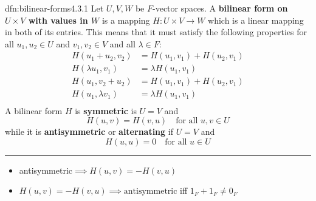 \documentclass[landscape, 8pt]{extarticle}
\DeclareMathOperator{\sgn}{sgn}
\DeclareMathOperator{\Mat}{Mat}
\begin{document}
\begin{multicols}{3}
%
%

\begin{dfn}{dfn:bilinear-forms}{4.3.1}
    Let $U,V,W$ be $F$-vector spaces. A \textbf{bilinear form on $U \times V$ with values in $W$} is a mapping $H: U \times V \to W $ which is a linear mapping in both of its entries. This means that it must satisfy the following properties for all $u_{1}, u_{2}\in U$ and $v_{1}, v_{2}\in V$ and all $\lambda\in F$:
    \begin{align*}
        H(u_{1} + u_{2}, v_{2}) &= H(u_{1}, v_{1}) + H(u_{2}, v_{1})\\
        H(\lambda u_{1}, v_{1}) &= \lambda H(u_{1}, v_{1}) \\
        H(u_{1}, v_{2} + u_{2}) &= H(u_{1}, v_{1}) + H(u_{2}, v_{1})\\
        H(u_{1},\lambda v_{1}) &= \lambda H(u_{1}, v_{1}) \\
    \end{align*}
    A bilinear form $H$ is \textbf{symmetric} is $U = V$ and
    \[H(u,v) = H(v,u)\quad \text{for all } u,v\in U\]
    while it is \textbf{antisymmetric} or \textbf{alternating} if $U = V$ and
    \[H(u, u) = 0 \quad\text{for all } u\in U\]

    \noindent\rule{\textwidth}{0.2pt}
    \begin{itemize}
        \item antisymmetric$\implies H(u, v) = -H(v, u)$
        \item $H(u, v) = -H(v, u) \implies \text{antisymmetric}$ iff $1_{F} + 1_{F} \ne 0_{F}$
    \end{itemize}
\end{dfn}


\end{multicols}
\end{document}
